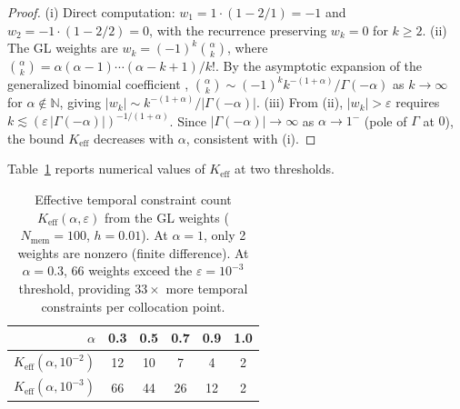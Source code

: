 \documentclass[preprint,12pt]{elsarticle}
\begin{document}
\begin{proof}
(i) Direct computation: $w_1 = 1 \cdot (1 - 2/1) = -1$ and $w_2 = -1 \cdot (1 - 2/2) = 0$, with the recurrence preserving $w_k = 0$ for $k \geq 2$.
(ii) The GL weights are $w_k = (-1)^k \binom{\alpha}{k}$, where $\binom{\alpha}{k} = \alpha(\alpha-1)\cdots(\alpha-k+1)/k!$. By the asymptotic expansion of the generalized binomial coefficient \cite{podlubny1999fractional,li2015numerical}, $\binom{\alpha}{k} \sim (-1)^k k^{-(1+\alpha)} / \Gamma(-\alpha)$ as $k \to \infty$ for $\alpha \notin \mathbb{N}$, giving $|w_k| \sim k^{-(1+\alpha)}/|\Gamma(-\alpha)|$.
(iii) From (ii), $|w_k| > \varepsilon$ requires $k \lesssim (\varepsilon\,|\Gamma(-\alpha)|)^{-1/(1+\alpha)}$. Since $|\Gamma(-\alpha)| \to \infty$ as $\alpha \to 1^-$ (pole of $\Gamma$ at $0$), the bound $K_{\mathrm{eff}}$ decreases with $\alpha$, consistent with (i).
\end{proof}

Table~\ref{tab:keff} reports numerical values of $K_{\mathrm{eff}}$ at two thresholds.

\begin{table}[t]
\centering
\caption{Effective temporal constraint count $K_{\mathrm{eff}}(\alpha, \varepsilon)$ from the GL weights ($N_{\mathrm{mem}} = 100$, $h = 0.01$). At $\alpha = 1$, only 2 weights are nonzero (finite difference). At $\alpha = 0.3$, 66 weights exceed the $\varepsilon = 10^{-3}$ threshold, providing $33\times$ more temporal constraints per collocation point.}
\label{tab:keff}
\begin{tabular}{rccccc}
\toprule
$\alpha$ & 0.3 & 0.5 & 0.7 & 0.9 & 1.0 \\
\midrule
$K_{\mathrm{eff}}(\alpha, 10^{-2})$ & 12 & 10 & 7 & 4 & 2 \\
$K_{\mathrm{eff}}(\alpha, 10^{-3})$ & 66 & 44 & 26 & 12 & 2 \\
\bottomrule
\end{tabular}
\end{table}
\end{document}
